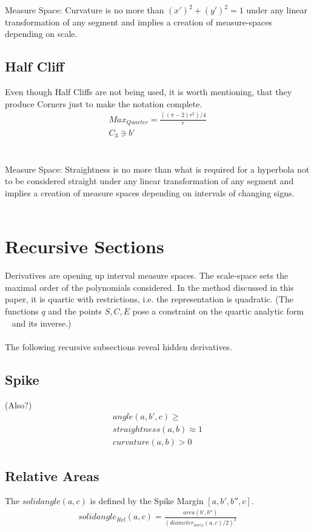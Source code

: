\documentclass{report}
\begin{document}
Measure Space: Curvature is no more than $(x')^2 + (y')^2 =1$  under any linear transformation of any segment and implies a creation of measure-spaces depending on scale.

\subsection*{Half Cliff}
Even though Half Cliffs are not being used, it is worth mentioning, that they produce Corners just to make the notation complete.
\begin{align}
Max_{Quarter}=\frac{((\pi-2) r^2) /4}{r}\\
C_{3} \ni b'
\end{align}\\\\

Measure Space: Straightness is no more than what is required for a hyperbola not to be considered straight under any linear transformation of any segment and implies a creation of measure spaces depending on intervals of changing signs.\\\\

\section{Recursive Sections}
Derivatives are opening up interval measure spaces. The scale-space sets the maximal order of the polynomials considered. In the method discussed in this paper, it is quartic with restrictions, i.e. the representation is quadratic.  (The functions $q$ and the points $S,C,E$ pose a constraint on the quartic analytic form ~\cite[Spline\_CharacteristicPolynomials.nb]{Stopeight} and its inverse.)\\\\
The following recursive subsections reveal hidden derivatives.

\subsection{Spike}
(Also?)
\begin{align}
angle(a,b',c)\geq\\
straightness(a,b)\approx 1\\
curvature(a,b)>0
\end{align}

\subsection{Relative Areas}
The $solidangle(a,c)$ is defined by the Spike Margin $[a,b',b'',c]$.
\begin{align}
solidangle_{Rel}(a,c) = \frac{area(b',b'')}{(diameter_{horiz}(a,c)/2)^2}
\end{align}
\end{document}
